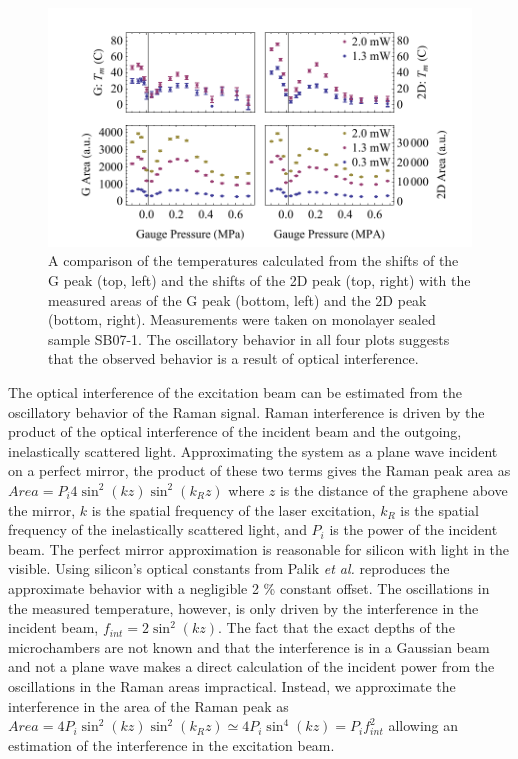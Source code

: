 \begin{figure}
	\begin{center}
	\includegraphics{Figs_Thermal/inter.pdf}
	\end{center}
	\caption[Issues with optical interference in thermal conductivity measurements]{\label{fig:therm:Inter}
		A comparison of the temperatures calculated from the shifts of the G peak (top, left) and the shifts of the 2D peak (top, right) with the measured areas of the G peak (bottom, left) and the 2D peak (bottom, right).
		Measurements were taken on monolayer sealed sample SB07-1.
		The oscillatory behavior in all four plots suggests that the observed behavior is a result of optical interference.
	}
\end{figure}

The optical interference of the excitation beam can be estimated from the oscillatory behavior of the Raman signal.
Raman interference is driven by the product of the optical interference of the incident beam and the outgoing, inelastically scattered light.
Approximating the system as a plane wave incident on a perfect mirror, the product of these two terms gives the Raman peak area as $Area=P_i 4 \sin^2(k z) \sin^2(k_R z)$ where $z$ is the distance of the graphene above the mirror, $k$ is the spatial frequency of the laser excitation, $k_R$ is the spatial frequency of the inelastically scattered light, and $P_i$ is the power of the incident beam.
The perfect mirror approximation is reasonable for silicon with light in the visible.
Using silicon's optical constants from Palik \textit{et al.} \cite{Palik1991} reproduces the approximate behavior with a negligible 2 \% constant offset.
The oscillations in the measured temperature, however, is only driven by the interference in the incident beam, $f_{int}=2 \sin^2(k z)$.
The fact that the exact depths of the microchambers are not known and that the interference is in a Gaussian beam and not a plane wave makes a direct calculation of the incident power from the oscillations in the Raman areas impractical.
Instead, we approximate the interference in the area of the Raman peak as $Area=4 P_i \sin^2(k z) \sin^2(k_R z) \simeq 4 P_i \sin^4(k z) = P_i f_{int}^2$ allowing an estimation of the interference in the excitation beam.

